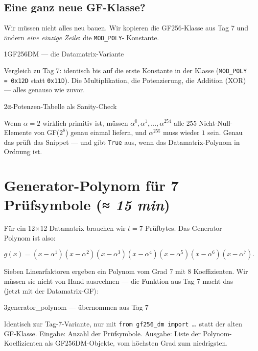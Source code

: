 \subsection*{Eine ganz neue GF-Klasse?}

Wir müssen nicht alles neu bauen. Wir kopieren die GF256-Klasse aus
Tag 7 und ändern \emph{eine einzige Zeile}: die \texttt{MOD\_POLY}-
Konstante.

\begin{pythoneinheit}{1}{GF256DM — die Datamatrix-Variante}

Vergleich zu Tag 7: identisch bis auf die erste Konstante in der
Klasse (\texttt{MOD\_POLY = 0x12D} statt \texttt{0x11D}). Die
Multiplikation, die Potenzierung, die Addition (XOR) — alles
genauso wie zuvor.
\end{pythoneinheit}

\begin{pythoneinheit}{2}{α-Potenzen-Tabelle als Sanity-Check}

Wenn $\alpha = 2$ wirklich primitiv ist, müssen $\alpha^0, \alpha^1,
\ldots, \alpha^{254}$ alle 255 Nicht-Null-Elemente von GF($2^8$)
genau einmal liefern, und $\alpha^{255}$ muss wieder $1$ sein.
Genau das prüft das Snippet — und gibt \texttt{True} aus, wenn das
Datamatrix-Polynom in Ordnung ist.
\end{pythoneinheit}

\section{Generator-Polynom für 7 Prüfsymbole \normalfont(\textit{≈ 15 min})}

Für ein 12$\times$12-Datamatrix brauchen wir $t = 7$ Prüfbytes. Das
Generator-Polynom ist also:

\[
  g(x) = (x - \alpha^1)(x - \alpha^2)(x - \alpha^3)(x - \alpha^4)
       (x - \alpha^5)(x - \alpha^6)(x - \alpha^7).
\]

Sieben Linearfaktoren ergeben ein Polynom vom Grad 7 mit 8
Koeffizienten. Wir müssen sie nicht von Hand ausrechnen — die
Funktion aus Tag 7 macht das (jetzt mit der Datamatrix-GF):

\begin{pythoneinheit}{3}{generator\_polynom — übernommen aus Tag 7}

Identisch zur Tag-7-Variante, nur mit \texttt{from gf256\_dm import
\dots}~statt der alten GF-Klasse. Eingabe: Anzahl der Prüfsymbole.
Ausgabe: Liste der Polynom-Koeffizienten als GF256DM-Objekte, vom
höchsten Grad zum niedrigsten.
\end{pythoneinheit}


